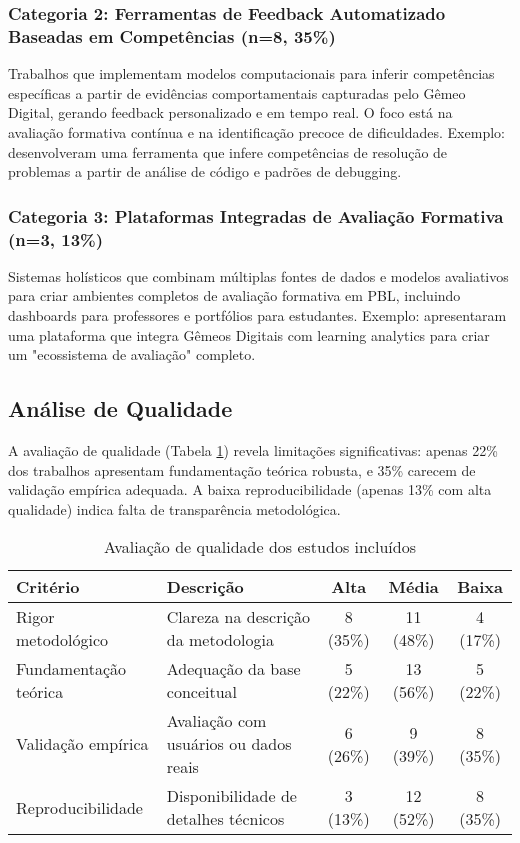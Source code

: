 \documentclass[english, spanish, brazilian]{RBIEarticle} %
\begin{document}
\subsubsection{Categoria 2: Ferramentas de Feedback Automatizado Baseadas em Competências (n=8, 35\%)}

Trabalhos que implementam modelos computacionais para inferir competências específicas a partir de evidências comportamentais capturadas pelo Gêmeo Digital, gerando feedback personalizado e em tempo real. O foco está na avaliação formativa contínua e na identificação precoce de dificuldades. Exemplo: \textcite{Kim2024} desenvolveram uma ferramenta que infere competências de resolução de problemas a partir de análise de código e padrões de debugging.

\subsubsection{Categoria 3: Plataformas Integradas de Avaliação Formativa (n=3, 13\%)}

Sistemas holísticos que combinam múltiplas fontes de dados e modelos avaliativos para criar ambientes completos de avaliação formativa em PBL, incluindo dashboards para professores e portfólios para estudantes. Exemplo: \textcite{Zhang2024} apresentaram uma plataforma que integra Gêmeos Digitais com learning analytics para criar um "ecossistema de avaliação" completo.

\subsection{Análise de Qualidade}

A avaliação de qualidade (Tabela \ref{tab:quality}) revela limitações significativas: apenas 22\% dos trabalhos apresentam fundamentação teórica robusta, e 35\% carecem de validação empírica adequada. A baixa reproducibilidade (apenas 13\% com alta qualidade) indica falta de transparência metodológica.

\begin{table}[htbp]
\centering
\caption{Avaliação de qualidade dos estudos incluídos}
\label{tab:quality}
\begin{tabularx}{\textwidth}{lXccc}
\toprule
\textbf{Critério} & \textbf{Descrição} & \textbf{Alta} & \textbf{Média} & \textbf{Baixa} \\
\midrule
Rigor metodológico & Clareza na descrição da metodologia & 8 (35\%) & 11 (48\%) & 4 (17\%) \\
Fundamentação teórica & Adequação da base conceitual & 5 (22\%) & 13 (56\%) & 5 (22\%) \\
Validação empírica & Avaliação com usuários ou dados reais & 6 (26\%) & 9 (39\%) & 8 (35\%) \\
Reproducibilidade & Disponibilidade de detalhes técnicos & 3 (13\%) & 12 (52\%) & 8 (35\%) \\
\bottomrule
\end{tabularx}
\end{table}
\end{document}
